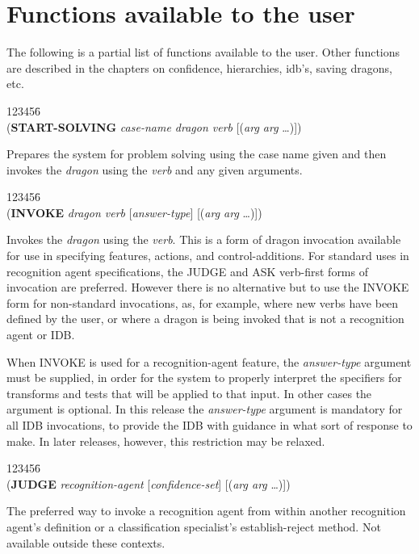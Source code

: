 \section{Functions available to the user}

The following is a partial list of functions available to the user.
Other functions are described in the chapters on confidence,
hierarchies, idb's, saving dragons, etc.

\begin{tabbing}
123456\= \kill
\\
({\bf START-SOLVING} {\it case-name dragon verb\/}
[({\it arg arg\/} \ldots)])
\end{tabbing}
Prepares the system for problem solving using the case name given
and then invokes the {\it dragon\/} using the {\it verb\/} and any given
arguments.

\begin{tabbing}
123456\= \kill
\\
({\bf INVOKE} {\it dragon verb\/} [{\it answer-type\/}]
[({\it arg arg\/} \ldots)])
\end{tabbing}
Invokes the {\it dragon\/} using the {\it verb\/}.  This is a form of dragon
invocation available for use in specifying features, actions, and
control-additions.  For standard uses in recognition agent
specifications, the JUDGE and ASK verb-first forms of invocation are
preferred.  However there is no alternative but to use the INVOKE form
for non-standard invocations, as, for example, where new verbs have
been defined by the user, or where a dragon is being invoked that is
not a recognition agent or IDB.

When INVOKE is used for a recognition-agent feature, the
{\it answer-type\/} argument must be supplied, in order for the system to
properly interpret the specifiers for transforms and tests that will
be applied to that input.  In other cases the argument is optional.
In this release the {\it answer-type\/} argument is mandatory
for all IDB invocations, to provide the IDB with guidance in what sort
of response to make.  In later releases, however, this restriction
may be relaxed.

\begin{tabbing}
123456\= \kill
\\
({\bf JUDGE} {\it recognition-agent\/} [{\it confidence-set\/}]
[({\it arg arg\/} \ldots)])
\end{tabbing}
The preferred way to invoke a recognition agent from within another
recognition agent's definition or a classification specialist's
establish-reject method. Not available outside these contexts.


